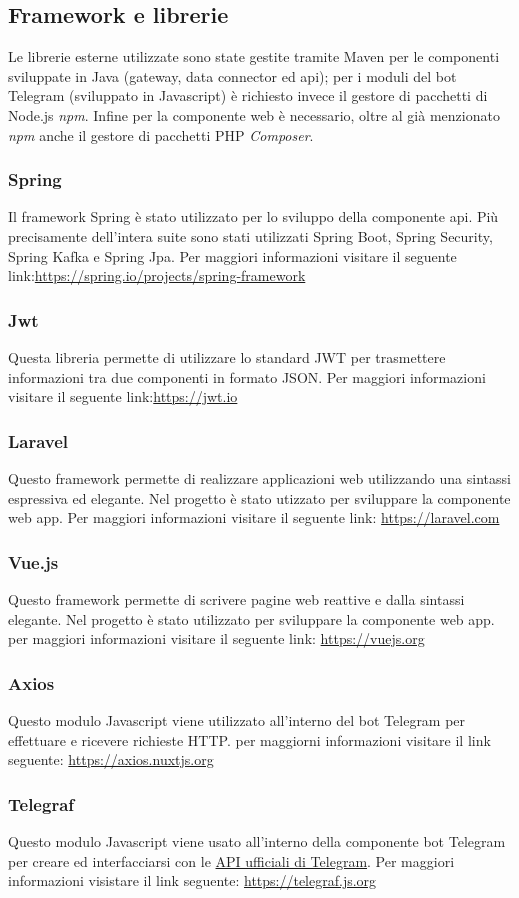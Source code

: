 	\subsection{Framework e librerie}
		Le librerie esterne utilizzate sono state gestite tramite Maven per le componenti sviluppate in Java (gateway, data connector ed api); per i moduli del bot Telegram (sviluppato in Javascript) è richiesto invece il gestore di pacchetti di Node.js \textit{npm}. Infine per la componente web è necessario, oltre al già menzionato \textit{npm} anche il gestore di pacchetti PHP \textit{Composer}.
		\subsubsection{Spring}
			Il framework Spring è stato utilizzato per lo sviluppo della componente api. Più precisamente dell'intera suite sono stati utilizzati Spring Boot, Spring Security, Spring Kafka e Spring Jpa. Per maggiori informazioni visitare il seguente link:\url{https://spring.io/projects/spring-framework}
		\subsubsection{Jwt}
			Questa libreria permette di utilizzare lo standard JWT per trasmettere informazioni tra due componenti in formato JSON. Per maggiori informazioni visitare il seguente link:\url{https://jwt.io}
		\subsubsection{Laravel}
			Questo framework permette di realizzare applicazioni web utilizzando una sintassi espressiva ed elegante. Nel progetto è stato utizzato per sviluppare la componente web app. Per maggiori informazioni visitare il seguente link: \url{https://laravel.com}
		\subsubsection{Vue.js}
			Questo framework permette di scrivere pagine web reattive e dalla sintassi elegante. Nel progetto è stato utilizzato per sviluppare la componente web app. per maggiori informazioni visitare il seguente link: \url{https://vuejs.org}
		\subsubsection{Axios}
			Questo modulo Javascript viene utilizzato all'interno del bot Telegram per effettuare e ricevere richieste HTTP. per maggiorni informazioni visitare il link seguente: \url{https://axios.nuxtjs.org}
		\subsubsection{Telegraf}
			Questo modulo Javascript viene usato all'interno della componente bot Telegram per creare ed interfacciarsi con le \href{https://core.telegram.org/bots/api}{API ufficiali di Telegram}. Per maggiori informazioni visistare il link seguente: \url{https://telegraf.js.org} 
	